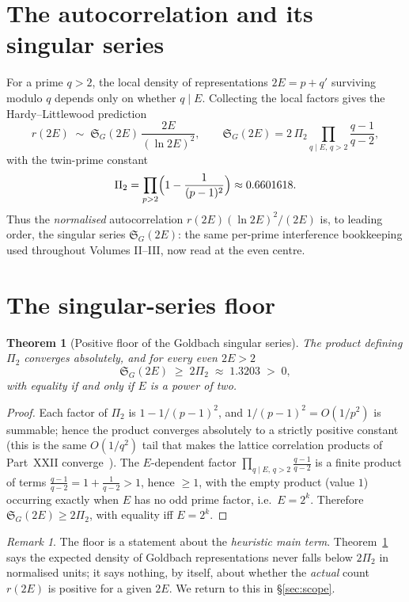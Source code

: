 \documentclass[11pt,a4paper]{article}
\newtheorem{theorem}{Theorem}
\theoremstyle{remark}\newtheorem{remark}{Remark}
\begin{document}
\section{The autocorrelation and its singular series}
For a prime $q>2$, the local density of representations $2E=p+q'$ surviving modulo
$q$ depends only on whether $q\mid E$. Collecting the local factors gives the
Hardy--Littlewood prediction
\begin{equation}
  r(2E)\;\sim\;\mathfrak{S}_G(2E)\,\frac{2E}{(\ln 2E)^2},\qquad
  \mathfrak{S}_G(2E)=2\,\Pi_2\!\!\prod_{q\mid E,\,q>2}\!\!\frac{q-1}{q-2},
  \label{eq:HL}
\end{equation}
with the twin-prime constant
\begin{equation}
  \Pi_2=\prod_{p>2}\Bigl(1-\frac{1}{(p-1)^2}\Bigr)\approx 0.6601618.
\end{equation}
Thus the \emph{normalised} autocorrelation $r(2E)(\ln 2E)^2/(2E)$ is, to leading
order, the singular series $\mathfrak{S}_G(2E)$: the same per-prime interference
bookkeeping used throughout Volumes II--III, now read at the even centre.

\section{The singular-series floor}
\begin{theorem}[Positive floor of the Goldbach singular series]\label{thm:floor}
The product defining $\Pi_2$ converges absolutely, and for every even $2E>2$
\[
  \mathfrak{S}_G(2E)\;\ge\;2\Pi_2\;\approx\;1.3203\;>\;0,
\]
with equality if and only if $E$ is a power of two.
\end{theorem}
\begin{proof}
Each factor of $\Pi_2$ is $1-1/(p-1)^2$, and $1/(p-1)^2=O(1/p^2)$ is summable; hence
the product converges absolutely to a strictly positive constant (this is the same
$O(1/q^2)$ tail that makes the lattice correlation products of Part~XXII
converge~\cite{ChenXXII}). The $E$-dependent factor
$\prod_{q\mid E,\,q>2}\frac{q-1}{q-2}$ is a finite product of terms
$\frac{q-1}{q-2}=1+\frac1{q-2}>1$, hence $\ge1$, with the empty product (value $1$)
occurring exactly when $E$ has no odd prime factor, i.e.\ $E=2^k$. Therefore
$\mathfrak{S}_G(2E)\ge2\Pi_2$, with equality iff $E=2^k$.
\end{proof}

\begin{remark}
The floor is a statement about the \emph{heuristic main term}. Theorem~\ref{thm:floor}
says the expected density of Goldbach representations never falls below $2\Pi_2$ in
normalised units; it says nothing, by itself, about whether the \emph{actual} count
$r(2E)$ is positive for a given $2E$. We return to this in \S\ref{sec:scope}.
\end{remark}
\end{document}
